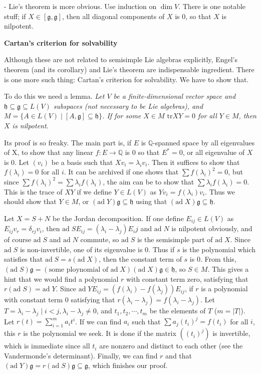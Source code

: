 \documentclass{article}
\newcommand{\RaQ}{\mathbb{Q}}
\newcommand{\SBar}{\;|\;}
\newcommand{\tr}[1]{\mathrm{tr}#1}
\newcommand{\lie}[1]{\mathfrak{#1}}
\newcommand{\ad}[1]{\mathrm{ad}\; #1}
\begin{document}
- Lie's theorem is more obvious. Use induction on $\dim{V}$.
There is one notable stuff; if $X \in [\lie{g}, \lie{g}]$, then all diagonal components of $X$ is 0, so that $X$ is nilpotent.

\newpage

\textbf{Cartan's criterion for solvability}

Although these are not related to semisimple Lie algebras explicitly, Engel's theorem (and its corollary) and Lie's theorem are indispensable ingredient.
There is one more such thing: Cartan's criterion for solvability.
We have to show that.

To do this we need a lemma.
\textit{Let $V$ be a finite-dimensional vector space and $\lie{h} \subseteq \lie{g} \subseteq L(V)$ subspaces (not necessary to be Lie algebras), and $M = \{A \in L(V) \SBar [A, \lie{g}] \subseteq \lie{h}\}$.
If for some $X \in M$ $\tr{XY} = 0$ for all $Y \in M$, then $X$ is nilpotent}.

Its proof is so freaky.
The main part is, if $E$ is $\RaQ$-spanned space by all eigenvalues of X, to show that any linear $f : E \to \RaQ$ is 0 so that $E^* = 0$, or all eigenvalue of $X$ is 0.
Let $(v_i)$ be a basis such that $Xv_i = \lambda_i v_i$.
Then it suffices to show that $f(\lambda_i) = 0$ for all $i$.
It can be archived if one shows that $\sum f(\lambda_i)^2 = 0$, but since $\sum f(\lambda_i)^2 = \sum \lambda_i f(\lambda_i)$, the aim can be to show that $\sum \lambda_i f(\lambda_i) = 0$.
This is the trace of $XY$ if we define $Y \in L(V)$ as $Yv_i = f(\lambda_i) v_i$.
Thus we should show that $Y \in M$, or $(\ad{Y}) \lie{g} \subseteq \lie{h}$ using that $(\ad{X}) \lie{g} \subseteq \lie{h}$.

Let $X = S + N$ be the Jordan decomposition.
If one define $E_{ij} \in L(V)$ as $E_{ij} v_r = \delta_{rj} v_i$, then $\ad{S} E_{ij} = (\lambda_i - \lambda_j) E_ij$ and $\ad{N}$ is nilpotent obviously, and of course $\ad{S}$ and $\ad{N}$ commute, so $\ad{S}$ is the semisimple part of $\ad{X}$.
Since $\ad{S}$ is non-invertible, one of its eigenvalue is 0.
Thus if $s$ is the polynomial which satisfies that $\ad{S} = s(\ad{X})$, then the constant term of $s$ is 0.
From this, $(\ad{S}) \lie{g} = (\textrm{some ploynomial of $\ad{X}$}) (\ad{X}) \lie{g} \in \lie{h}$, so $S \in M$. This gives a hint that we would find a polynomial $r$ with constant term zero, satisfying that $r(\ad{S}) = \ad{Y}$.
Since $\ad{Y}E_{ij} = (f(\lambda_i) - f(\lambda_j)) E_{ij}$, if $r$ is a polynomial with constant term 0 satisfying that $r(\lambda_i - \lambda_j) = f(\lambda_i - \lambda_j)$.
Let $T = {\lambda_i - \lambda_j \SBar i < j, \lambda_i - \lambda_j \ne 0}$, and $t_1, t_2, \cdots, t_m$ be the elements of $T$ ($m = |T|$).
Let $r(t) = \sum_{i = 1}^m a_i t^i$.
If we can find $a_i$ such that $\sum a_j (t_i)^j = f(t_i)$ for all $i$, this $r$ is the polynomial we seek.
It is done if the matrix $((t_i)^j)$ is invertible, which is immediate since all $t_i$ are nonzero and distinct to each other (see the Vandermonde's determinant).
Finally, we can find $r$ and that $(\ad{Y}) \lie{g} = r(\ad{S}) \lie{g} \subseteq \lie{g}$, which finishes our proof.
\end{document}
